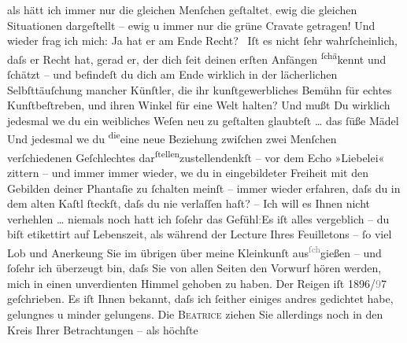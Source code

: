                als hätt ich immer nur die gleichen Menſchen geſtaltet\textcolor{gray}{,}{ }{\pb}ewig die gleichen Situationen dargeſtellt –
               ewig u immer nur die grüne Cravate getragen! Und wieder frag ich mich: Ja hat er am
               Ende Recht? {\dotstwo} Iſt es nicht ſehr wahrſcheinlich, daſs er
               Recht hat, gerad er, der dich ſeit deinen erſten Anfängen \substVorne{}\textsuperscript{ſchä}\substDazwischen{}ke\substHinten{}nnt und ſchätzt – und befindeſt du dich am Ende wirklich in der lächerlichen
               Selbſttäuſchung mancher {\pb}Künſtler, die ihr
               kunſtgewerbliches Bemühn für echtes Kunſtbeſtreben, und ihren Winkel für eine Welt
               halten? Und mußt Du wirklich jedesmal we{\geminationn} du ein
               weibliches Weſen neu zu geſtalten glaubteſt \label{T_L02988-4v}\label{T_L02988-4}{ }{\dots} das ſüße Mädel {\dotstwo} Und jedesmal
                  we{\geminationn} du \substVorne{}\textsuperscript{die}\substDazwischen{}eine neue\substHinten{} Beziehung zwiſchen zwei Menſchen verſchiedenen Geſchlechtes dar\substVorne{}\textsuperscript{ſtellen}\substDazwischen{}zustellen\substHinten{}{ }{\pb}denkſt – vor dem Echo »Liebelei« zittern – und immer immer wieder, we{\geminationn} du in eingebildeter Freiheit mit den Gebilden deiner
               Phantaſie zu ſchalten meinſt – immer wieder erfahren, daſs du in dem alten Kaſtl
               ſteckſt, daſs du nie verlaſſen haſt? – Ich will es Ihnen nicht verhehlen {\dots} niemals noch hatt ich ſoſehr das
                  Gefühl\textcolor{gray}{:}{\pb}Es iſt alles vergeblich – du biſt etikettirt
               auf Lebenszeit, als während der Lecture Ihres Feuilletons – ſo viel Lob und Anerke{\geminationn}ung Sie im übrigen über meine Kleinkunſt aus\substVorne{}\textsuperscript{\textcolor{gray}{ſch}}\substDazwischen{}gi\substHinten{}eßen – und ſoſehr ich überzeugt bin, daſs Sie von allen Seiten den Vorwurf
               hören werden, mich in einen unverdienten Himmel gehoben zu haben. Der Reigen iſt 1896/\textcolor{gray}{9}7 geſchrieben. Es iſt {\pb}Ihnen bekannt, daſs ich ſeither einiges
               andres gedichtet habe, gelungnes u minder gelungens. Die \textsc{Beatrice} ziehen Sie allerdings noch in den Kreis Ihrer Betrachtungen – als höchſte
